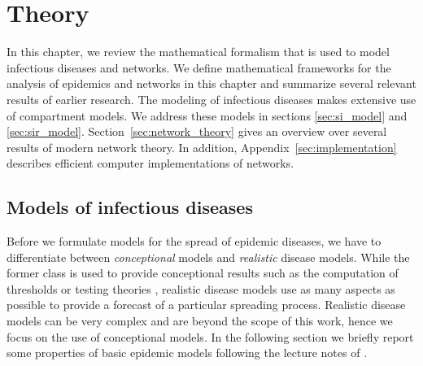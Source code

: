 %
%
%
%
%
%
%
%


\chapter{Theory}\label{sec:theory}
In this chapter, we review the mathematical formalism that is used to model infectious diseases and networks.
We define mathematical frameworks for the analysis of epidemics and networks in this chapter and summarize several relevant results of earlier research.
The modeling of infectious diseases makes extensive use of compartment models.
We address these models in sections \ref{sec:si_model} and \ref{sec:sir_model}.
Section~\ref{sec:network_theory} gives an overview over several results of modern network theory.
In addition, Appendix~\ref{sec:implementation} describes efficient computer implementations of networks.

\section{Models of infectious diseases}\label{sec:inf_diseases}
Before we formulate models for the spread of epidemic diseases, we have to differentiate between \emph{conceptional} models and \emph{realistic} disease models.
While the former class is used to provide conceptional results such as the computation of thresholds or testing theories \citep{Hethcote:2000}, realistic disease models use as many aspects as possible to provide a forecast of a particular spreading process.
Realistic disease models can be very complex and are beyond the scope of this work, hence we focus on the use of conceptional models.
In the following section we briefly report some properties of basic epidemic models following the lecture notes of \citet{Chasnov:2010}.

